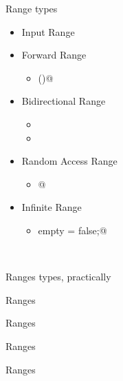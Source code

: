 \documentclass[aspectratio=169,notes]{beamer}
\begin{document}
	\begin{frame}[fragile]{Range types}
		\begin{itemize}
			\item Input Range
				\pause
			\item Forward Range
			\begin{itemize}
				\item \lstinline@save()@
			\end{itemize}
			\item Bidirectional Range
			\begin{itemize}
				\item \lstinline@back@
				\item \lstinline@popBack@
			\end{itemize}
			\item Random Access Range
			\begin{itemize}
				\item \lstinline@[]@
			\end{itemize}
			\item Infinite Range
			\begin{itemize}
				\item \lstinline@enum empty = false;@
			\end{itemize}
		\end{itemize}\mbox{}\\[1cm]
	\end{frame}
	\begin{frame}[fragile]{Ranges types, practically}
		
	\end{frame}

	\begin{frame}[fragile]{Ranges}
		
	\end{frame}

	\begin{frame}[fragile]{Ranges}
		
	\end{frame}

	\begin{frame}[fragile]{Ranges}
		
	\end{frame}

	\begin{frame}[fragile]{Ranges}
		
	\end{frame}
\end{document}
